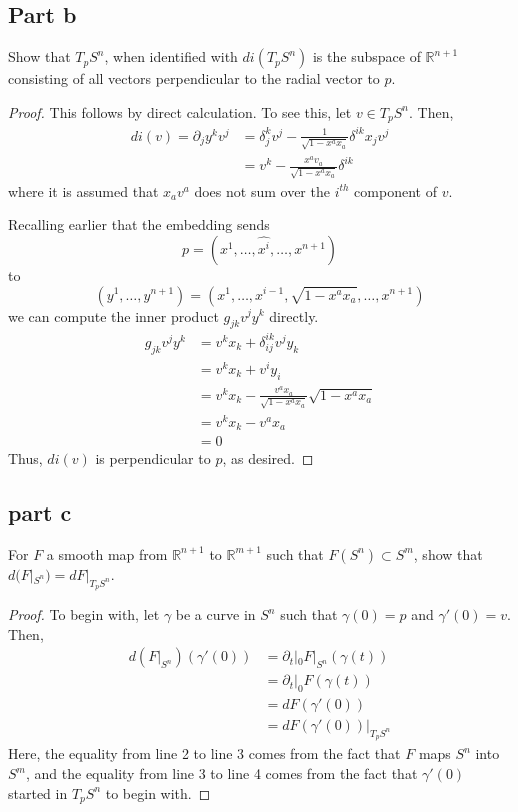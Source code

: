 \documentclass[fontsize=11pt]{scrartcl} %
\numberwithin{equation}{section} %
\numberwithin{figure}{section} %
\numberwithin{table}{section} %
\newcommand{\R}{\mathbb{R}}
\begin{document}
\subsection*{Part b}
Show that $T_pS^n$, when identified with $di(T_pS^n)$ is the subspace of $\R^{n+1}$ consisting
of all vectors perpendicular to the radial vector to $p$.
\\
\begin{proof}
This follows by direct calculation. To see this, let $v\in T_pS^n$. Then,
\[
\begin{aligned}
di(v) = \partial_jy^kv^j &= \delta_j^kv^j-\frac{1}{\sqrt{1-x^ax_a}}\delta^{ik}x_jv^j\\
                &= v^k - \frac{x^av_a}{\sqrt{1-x^ax_a}}\delta^{ik}
\end{aligned}
\]
where it is assumed that $x_av^a$ does not sum over the $i^{th}$ component of $v$.

Recalling earlier that the embedding sends 
\[
p = (x^1,\ldots,\hat{x^i},\ldots,x^{n+1})
\]
to 
\[
(y^1,\ldots,y^{n+1}) = (x^1,\ldots,x^{i-1},\sqrt{1-x^ax_a},\ldots,x^{n+1})
\]
we can compute the inner product $g_{jk}v^jy^k$ directly.
\[
\begin{aligned}
g_{jk}v^jy^k &= v^kx_k + \delta^{ik}_{ij}v^jy_k\\
            &=v^kx_k + v^iy_i\\
            &=v^kx_k -\frac{v^ax_a}{\sqrt{1-x^ax_a}}\sqrt{1-x^ax_a}\\
            &=v^kx_k - v^ax_a\\
            &= 0 
\end{aligned}
\]
Thus, $di(v)$ is perpendicular to $p$, as desired.
\end{proof}

\subsection*{part c}
For $F$ a smooth map from $\R^{n+1}$ to $\R^{m+1}$ such that $F(S^n)\subset S^m$, show
that $d(F|_{S^n}) = dF|_{T_pS^n}$.
\\
\begin{proof}
To begin with, let $\gamma$ be a curve in $S^n$ such that
$\gamma(0)=p$ and $\gamma'(0)=v$. Then,
\[
\begin{aligned}
d(F|_{S^n})(\gamma'(0)) &= \partial_t|_0 F|_{S^n}(\gamma(t))\\
                        &= \partial_t|_0 F(\gamma(t))\\
                        &= dF(\gamma'(0))\\
                        &= dF(\gamma'(0))|_{T_pS^n}
\end{aligned}
\]
Here, the equality from line 2 to line 3 comes from the fact that $F$ maps $S^n$ into $S^m$,
and the equality from line 3 to line 4 comes from the fact that $\gamma'(0)$ started in
$T_pS^n$ to begin with.
\end{proof}
\newpage
\end{document}
